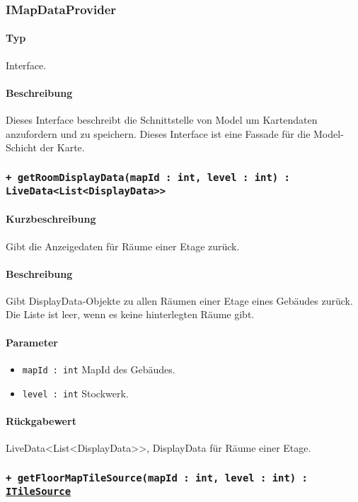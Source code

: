 \subsubsection{IMapDataProvider}
\paragraph*{Typ}
Interface.
\paragraph*{Beschreibung}
Dieses Interface beschreibt die Schnittstelle von Model um Kartendaten anzufordern und zu speichern.
Dieses Interface ist eine Fassade für die Model-Schicht der Karte.

\subsubsection*{\texttt{+ getRoomDisplayData(mapId : int, level : int) : LiveData<List<DisplayData>>}}%
\paragraph*{Kurzbeschreibung}
Gibt die Anzeigedaten für Räume einer Etage zurück.
\paragraph*{Beschreibung}
Gibt DisplayData-Objekte zu allen Räumen einer Etage eines Gebäudes zurück.\\
Die Liste ist leer, wenn es keine hinterlegten Räume gibt.
\paragraph*{Parameter}
\begin{itemize}
    \item \texttt{mapId : int} MapId des Gebäudes.
    \item \texttt{level : int} Stockwerk.
\end{itemize}
\paragraph*{Rückgabewert}
LiveData<List<DisplayData>>, DisplayData für Räume einer Etage.

\subsubsection*{\texttt{+ getFloorMapTileSource(mapId : int, level : int) : \href{https://osmdroid.github.io/osmdroid/javadocAll/org/osmdroid/tileprovider/tilesource/ITileSource.html}
{ITileSource}}}%
